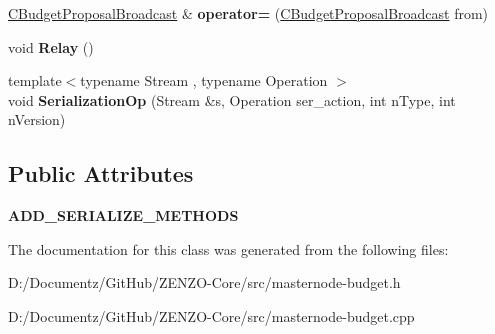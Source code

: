 \begin{DoxyCompactItemize}
\mbox{\hyperlink{class_c_budget_proposal_broadcast}{C\+Budget\+Proposal\+Broadcast}} \& {\bfseries operator=} (\mbox{\hyperlink{class_c_budget_proposal_broadcast}{C\+Budget\+Proposal\+Broadcast}} from)
\item 
\mbox{\label{class_c_budget_proposal_broadcast_a7a791236cedfc5beb5fefa438d5626fb}} 
void {\bfseries Relay} ()
\item 
\mbox{\label{class_c_budget_proposal_broadcast_ab0c507f96fb17fd51eb874f7532ae887}} 
{\footnotesize template$<$typename Stream , typename Operation $>$ }\\void {\bfseries Serialization\+Op} (Stream \&s, Operation ser\+\_\+action, int n\+Type, int n\+Version)
\end{DoxyCompactItemize}
\subsection*{Public Attributes}
\begin{DoxyCompactItemize}
\item 
\mbox{\label{class_c_budget_proposal_broadcast_ad5372e24fcfa7ba233702140908fd0f6}} 
{\bfseries A\+D\+D\+\_\+\+S\+E\+R\+I\+A\+L\+I\+Z\+E\+\_\+\+M\+E\+T\+H\+O\+DS}
\end{DoxyCompactItemize}


The documentation for this class was generated from the following files\+:\begin{DoxyCompactItemize}
\item 
D\+:/\+Documentz/\+Git\+Hub/\+Z\+E\+N\+Z\+O-\/\+Core/src/masternode-\/budget.\+h\item 
D\+:/\+Documentz/\+Git\+Hub/\+Z\+E\+N\+Z\+O-\/\+Core/src/masternode-\/budget.\+cpp\end{DoxyCompactItemize}
